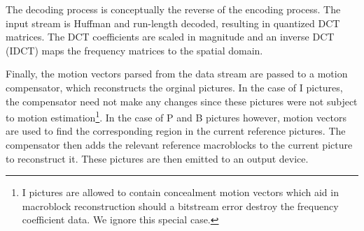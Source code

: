 
The decoding process is conceptually the reverse of the encoding
process. The input stream is Huffman and run-length decoded, resulting
in quantized DCT matrices. The DCT coefficients are scaled in
magnitude and an inverse DCT (IDCT) maps the frequency matrices to the
spatial domain.

Finally, the motion vectors parsed from the data stream are passed to
a motion compensator, which reconstructs the orginal pictures. In the
case of I pictures, the compensator need not make any changes since
these pictures were not subject to motion estimation\footnote{I
pictures are allowed to contain concealment motion vectors which aid in
macroblock reconstruction should a bitstream error destroy the
frequency coefficient data. We ignore this special case.}. In the case of P
and B pictures however, motion vectors are used to find the
corresponding region in the current reference pictures. The
compensator then adds the relevant reference macroblocks to the
current picture to reconstruct it. These pictures are then emitted to
an output device.